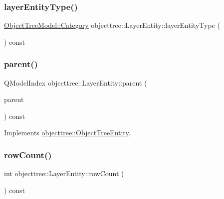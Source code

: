 \subsubsection{\texorpdfstring{layerEntityType()}{layerEntityType()}}
{\footnotesize\ttfamily \mbox{\hyperlink{class_object_tree_model_a379e9d6b0d381853785adf62095ba4e3}{Object\+Tree\+Model\+::\+Category}} objecttree\+::\+Layer\+Entity\+::layer\+Entity\+Type (\begin{DoxyParamCaption}{ }\end{DoxyParamCaption}) const\hspace{0.3cm}{\ttfamily [inline]}}

\mbox{\label{classobjecttree_1_1_layer_entity_a68d36c7d2efe34d58e47d412e7cdd5b7}} 
\subsubsection{\texorpdfstring{parent()}{parent()}}
{\footnotesize\ttfamily Q\+Model\+Index objecttree\+::\+Layer\+Entity\+::parent (\begin{DoxyParamCaption}\item[{const Q\+Model\+Index \&}]{parent }\end{DoxyParamCaption}) const\hspace{0.3cm}{\ttfamily [virtual]}}



Implements \mbox{\hyperlink{classobjecttree_1_1_object_tree_entity_a2d1b13c056476f87637aacd7e99e7305}{objecttree\+::\+Object\+Tree\+Entity}}.

\mbox{\label{classobjecttree_1_1_layer_entity_a259e8a98d51dcc7377317ffd1a30c63b}} 
\subsubsection{\texorpdfstring{rowCount()}{rowCount()}}
{\footnotesize\ttfamily int objecttree\+::\+Layer\+Entity\+::row\+Count (\begin{DoxyParamCaption}{ }\end{DoxyParamCaption}) const\hspace{0.3cm}{\ttfamily [virtual]}}



